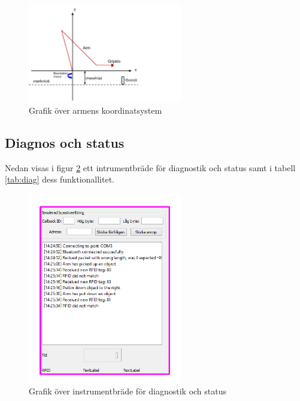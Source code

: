 \documentclass[a4paper,12pt]{article}
\begin{document}
\begin{figure}[H]
	\centering
	\includegraphics[width=0.6\textwidth]{arm_koord.pdf}
	\caption{Grafik över armens koordinatsystem}
	\label{fig:arm_koord}
\end{figure}

\subsection{Diagnos och status}
\label{subsec:diag}
Nedan visas i figur \ref{fig:pc_diag} ett intrumentbräde för diagnostik och status samt i tabell \ref{tab:diag} dess funktionallitet.

\begin{figure}[H]
	\centering
	\includegraphics[width=0.6\textwidth]{diag.pdf}
	\caption{Grafik över instrumentbräde för diagnostik och status}
	\label{fig:pc_diag}
\end{figure}
\end{document}
